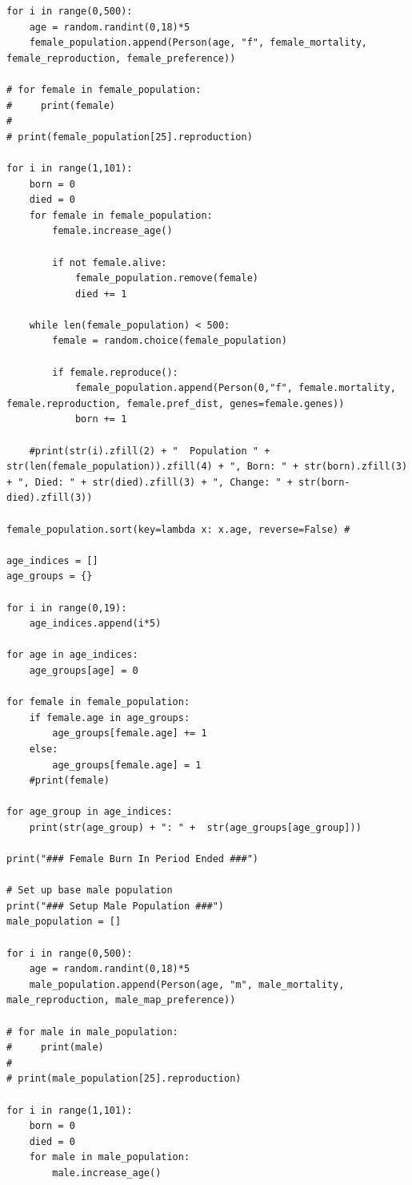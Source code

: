 \documentclass[authoryearcitations]{UoYCSproject}
\begin{document}
\begin{landscape}
\begin{verbatim}
for i in range(0,500):
    age = random.randint(0,18)*5
    female_population.append(Person(age, "f", female_mortality, female_reproduction, female_preference))

# for female in female_population:
#     print(female)
#
# print(female_population[25].reproduction)

for i in range(1,101):
    born = 0
    died = 0
    for female in female_population:
        female.increase_age()

        if not female.alive:
            female_population.remove(female)
            died += 1

    while len(female_population) < 500:
        female = random.choice(female_population)

        if female.reproduce():
            female_population.append(Person(0,"f", female.mortality, female.reproduction, female.pref_dist, genes=female.genes))
            born += 1

    #print(str(i).zfill(2) + "  Population " + str(len(female_population)).zfill(4) + ", Born: " + str(born).zfill(3) + ", Died: " + str(died).zfill(3) + ", Change: " + str(born-died).zfill(3))

female_population.sort(key=lambda x: x.age, reverse=False) #

age_indices = []
age_groups = {}

for i in range(0,19):
    age_indices.append(i*5)

for age in age_indices:
    age_groups[age] = 0

for female in female_population:
    if female.age in age_groups:
        age_groups[female.age] += 1
    else:
        age_groups[female.age] = 1
    #print(female)

for age_group in age_indices:
    print(str(age_group) + ": " +  str(age_groups[age_group]))

print("### Female Burn In Period Ended ###")

# Set up base male population
print("### Setup Male Population ###")
male_population = []

for i in range(0,500):
    age = random.randint(0,18)*5
    male_population.append(Person(age, "m", male_mortality, male_reproduction, male_map_preference))

# for male in male_population:
#     print(male)
#
# print(male_population[25].reproduction)

for i in range(1,101):
    born = 0
    died = 0
    for male in male_population:
        male.increase_age()


\end{verbatim}
\end{landscape}
\end{document}
